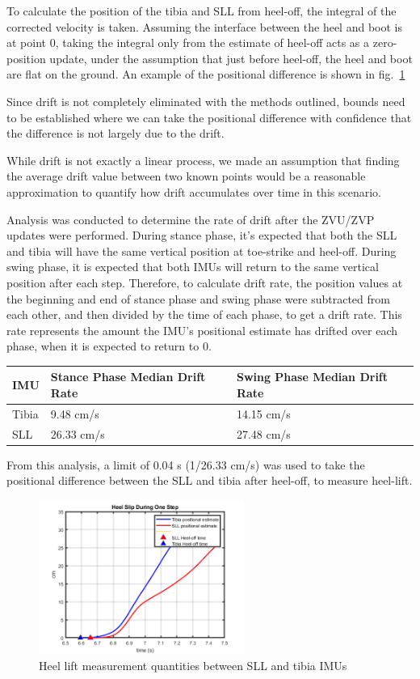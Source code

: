 \documentclass[defaultstyle,11pt]{comps}
\begin{document}
To calculate the position of the tibia and SLL from heel-off, the integral of the corrected velocity is taken.
Assuming the interface between the heel and boot is at point 0, taking the integral only from the estimate of heel-off acts as a zero-position update, under the assumption that just before heel-off, the heel and boot are flat on the ground. An example of the positional difference is shown in fig.~\ref{fig:SA1-position}

Since drift is not completely eliminated with the methods outlined, bounds need to be established where we can take the positional difference with confidence that the difference is not largely due to the drift.

While drift is not exactly a linear process, we made an assumption that finding the average drift value between two known points would be a reasonable approximation to quantify how drift accumulates over time in this scenario.

Analysis was conducted to determine the rate of drift after the ZVU/ZVP updates were performed.
During stance phase, it's expected that both the SLL and tibia will have the same vertical position at toe-strike and heel-off.
During swing phase, it is expected that both IMUs will return to the same vertical position after each step.
Therefore, to calculate drift rate, the position values at the beginning and end of stance phase and swing phase were subtracted from each other, and then divided by the time of each phase, to get a drift rate.
This rate represents the amount the IMU's positional estimate has drifted over each phase, when it is expected to return to 0.

\begin{longtable}[]{@{}lll@{}}
\toprule
IMU & Stance Phase Median Drift Rate & Swing Phase Median Drift Rate\tabularnewline
\midrule
\endhead
Tibia & 9.48 cm/s & 14.15 cm/s\tabularnewline
SLL & 26.33 cm/s & 27.48 cm/s\tabularnewline
\bottomrule
\end{longtable}

From this analysis, a limit of 0.04 s (1/26.33 cm/s) was used to take the positional difference between the SLL and tibia after heel-off, to measure heel-lift.

\begin{figure}
\hypertarget{fig:SA1-position}{%
\centering
\includegraphics[width=0.6\textwidth,height=\textheight]{../fig/SA1/S3C0T1R_Meas.png}
\caption{Heel lift measurement quantities between SLL and tibia IMUs}\label{fig:SA1-position}
}
\end{figure}
\end{document}
